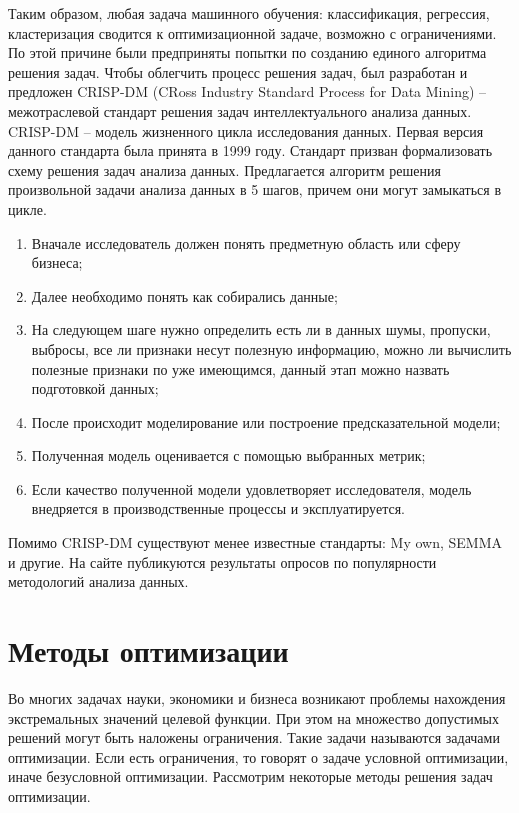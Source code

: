 Таким образом, любая задача машинного обучения: классификация, регрессия, кластеризация сводится к оптимизационной задаче, возможно с ограничениями. По этой причине были предприняты попытки по созданию единого алгоритма решения задач. Чтобы облегчить процесс решения задач, был разработан и предложен CRISP-DM (CRoss Industry Standard Process for Data Mining) -- межотраслевой стандарт решения задач интеллектуального анализа данных. CRISP-DM -- модель жизненного цикла исследования данных.
Первая версия данного стандарта была принята в 1999 году. Стандарт призван формализовать схему решения задач анализа данных. Предлагается алгоритм решения произвольной задачи анализа данных в 5 шагов, причем они могут замыкаться в цикле.

\begin{enumerate}[label=\arabic*.]
    \item Вначале исследователь должен понять предметную область или сферу бизнеса;
    \item Далее необходимо понять как собирались данные;
    \item На следующем шаге нужно определить есть ли в данных шумы, пропуски, выбросы, все ли признаки несут полезную информацию, можно ли вычислить полезные признаки по уже имеющимся, данный этап можно назвать подготовкой данных;
    \item После происходит моделирование или построение предсказательной модели;
    \item Полученная модель оценивается с помощью выбранных метрик;
    \item Если качество полученной модели удовлетворяет исследователя, модель внедряется в производственные процессы и эксплуатируется.
\end{enumerate}
Помимо CRISP-DM существуют менее известные стандарты: My own, SEMMA и другие. На сайте \cite{poll:crisp_dm} публикуются результаты опросов по популярности методологий анализа данных.



\section{Методы оптимизации}

Во многих задачах науки, экономики и бизнеса возникают проблемы нахождения экстремальных значений целевой функции. При этом на множество допустимых решений могут быть наложены ограничения. Такие задачи называются задачами оптимизации. Если есть ограничения, то говорят о задаче условной оптимизации, иначе безусловной оптимизации. Рассмотрим некоторые методы решения задач оптимизации.



